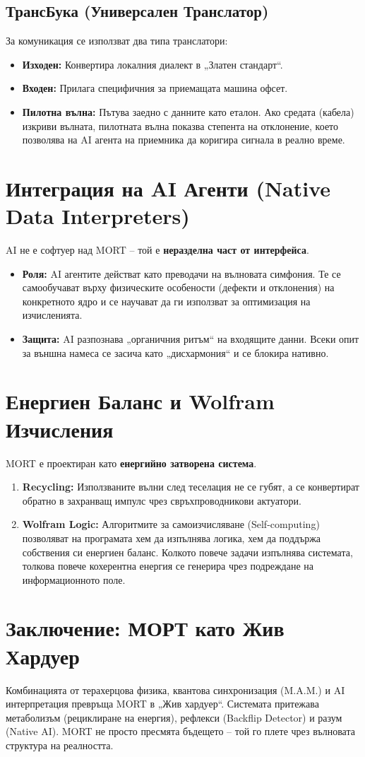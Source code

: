 \documentclass[12pt,a4paper]{article}
\begin{document}
\subsection{ТрансБука (Универсален Транслатор)}
За комуникация се използват два типа транслатори:
\begin{itemize}
    \item \textbf{Изходен:} Конвертира локалния диалект в „Златен стандарт“.
    \item \textbf{Входен:} Прилага специфичния за приемащата машина офсет.
    \item \textbf{Пилотна вълна:} Пътува заедно с данните като еталон. Ако средата (кабела) изкриви вълната, пилотната вълна показва степента на отклонение, което позволява на AI агента на приемника да коригира сигнала в реално време.
\end{itemize}

\section{Интеграция на AI Агенти (Native Data Interpreters)}
AI не е софтуер над MORT – той е \textbf{неразделна част от интерфейса}. 
\begin{itemize}
    \item \textbf{Роля:} AI агентите действат като преводачи на вълновата симфония. Те се самообучават върху физическите особености (дефекти и отклонения) на конкретното ядро и се научават да ги използват за оптимизация на изчисленията.
    \item \textbf{Защита:} AI разпознава „органичния ритъм“ на входящите данни. Всеки опит за външна намеса се засича като „дисхармония“ и се блокира нативно.
\end{itemize}

\section{Енергиен Баланс и Wolfram Изчисления}
MORT е проектиран като \textbf{енергийно затворена система}. 
\begin{enumerate}
    \item \textbf{Recycling:} Използваните вълни след теселация не се губят, а се конвертират обратно в захранващ импулс чрез свръхпроводникови актуатори.
    \item \textbf{Wolfram Logic:} Алгоритмите за самоизчисляване (Self-computing) позволяват на програмата хем да изпълнява логика, хем да поддържа собствения си енергиен баланс. Колкото повече задачи изпълнява системата, толкова повече кохерентна енергия се генерира чрез подреждане на информационното поле.
\end{enumerate}

\section{Заключение: МОРТ като Жив Хардуер}
Комбинацията от терахерцова физика, квантова синхронизация (M.A.M.) и AI интерпретация превръща MORT в „Жив хардуер“. Системата притежава метаболизъм (рециклиране на енергия), рефлекси (Backflip Detector) и разум (Native AI). MORT не просто пресмята бъдещето – той го плете чрез вълновата структура на реалността.
\end{document}
